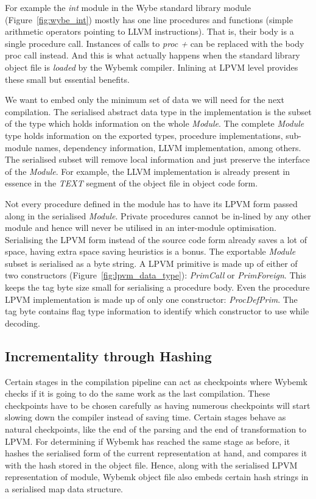 For example the \textit{int} module in the Wybe standard library module
(Figure~\ref{fig:wybe_int}) mostly has one line procedures and functions
(simple arithmetic operators pointing to LLVM instructions). That is, their
body is a single procedure call. Instances of calls to \textit{proc +} can be
replaced with the body proc call instead. And this is what actually happens
when the standard library object file is \textit{loaded} by the Wybemk
compiler. Inlining at LPVM level provides these small but essential benefits.

We want to embed only the minimum set of data we will need for the next
compilation. The serialised abstract data type in the implementation is the
subset of the type which holds information on the whole \textit{Module}. The
complete \textit{Module} type holds information on the exported types,
procedure implementations, sub-module names, dependency information, LLVM
implementation, among others. The serialised subset will remove local
information and just preserve the interface of the \textit{Module}. For
example, the LLVM implementation is already present in essence in the
\textit{TEXT} segment of the object file in object code form.

Not every procedure defined in the module has to have its LPVM form passed
along in the serialised \textit{Module}. Private procedures cannot be in-lined
by any other module and hence will never be utilised in an inter-module
optimisation. Serialising the LPVM form instead of the source code form already
saves a lot of space, having extra space saving heuristics is a bonus. The
exportable \textit{Module} subset is serialised as a byte string. A LPVM
primitive is made up of either of two constructors
(Figure~\ref{fig:lpvm_data_type}): \textit{PrimCall} or
\textit{PrimForeign}. This keeps the tag byte size small for serialising a
procedure body. Even the procedure LPVM implementation is made up of only one
constructor: \textit{ProcDefPrim}. The tag byte contains flag type information
to identify which constructor to use while decoding.



\subsection{Incrementality through Hashing}

Certain stages in the compilation pipeline can act as checkpoints where Wybemk
checks if it is going to do the same work as the last compilation. These
checkpoints have to be chosen carefully as having numerous checkpoints will
start slowing down the compiler instead of saving time. Certain stages behave
as natural checkpoints, like the end of the parsing and the end of
transformation to LPVM. For determining if Wybemk has reached the same stage as
before, it hashes the serialised form of the current representation at hand,
and compares it with the hash stored in the object file. Hence, along with the
serialised LPVM representation of module, Wybemk object file also embeds
certain hash strings in a serialised map data structure.

